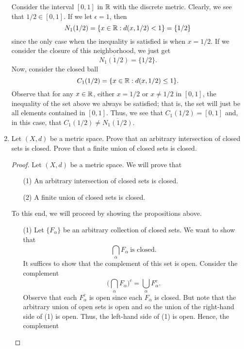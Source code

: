 \documentclass[a4paper]{article}
\begin{document}
\begin{enumerate}
        \begin{solution}
            Consider the interval \( [0,1] \) in \( \mathbb{R}  \) with the discrete metric. Clearly, we see that \( 1/2 \in [0,1] \). If we let \( \epsilon = 1   \), then 
            \[  {N}_{1}(1/2) = \{ x \in \mathbb{R} : d(x,1/2) < 1 \} = \{ 1/2 \}  \]
            since the only case when the inequality is satisfied is when \( x =  1/2  \). If we consider the closure of this neighborhood, we just get 
            \[  \overline{{N}_{1}(1/2)} = \{ 1/2 \}. \]
            Now, consider the closed ball 
            \[  {C}_{1}(1/2) = \{ x \in \mathbb{R} : d(x,1/2) \leq 1  \}. \]
            Observe that for any \( x \in \mathbb{R}  \), either \( x = 1/2 \) or \( x \neq 1/2 \) in \( [0,1] \), the inequality of the set above we always be satisfied; that is, the set will just be all elements contained in \( [0,1]  \). Thus, we see that \( {C}_{1}(1/2) = [0,1] \) and, in this case, that \( {C}_{1}(1/2) \neq \overline{{N}_{1}(1/2)} \).  
        \end{solution}
    \item Let \( (X,d) \) be a metric space. Prove that an arbitrary intersection of closed sets is closed. Prove that a finite union of closed sets is closed. 
        \begin{proof}
        Let \( (X,d) \) be a metric space. We will prove that
        \begin{enumerate}
            \item[(1)] An arbitrary intersection of closed sets is closed.
            \item[(2)] A finite union of closed sets is closed.
        \end{enumerate}
        To this end, we will proceed by showing the propositions above. 
        \begin{enumerate}
            \item[(1)] Let \( \{ {F}_{\alpha} \}  \) be an arbitrary collection of closed sets. We want to show that 
                \[  \bigcap_{ \alpha }^{  }  {F}_{\alpha} \ \text{is closed.} \]
               It suffices to show that the complement of this set is open. Consider the complement
               \[  \Big(  \bigcap_{ \alpha }^{  }  {F}_{\alpha} \Big)^{c} = \bigcup_{ \alpha }^{  } {F}_{\alpha}^{c}. \tag{1} \]
               Observe that each \( {F}_{\alpha}^{c} \) is open since each \( {F}_{\alpha} \) is closed. But note that the arbitrary union of open sets is open and so the union of the right-hand side of (1) is open. Thus, the left-hand side of (1) is open. Hence, the complement  

\end{enumerate}
\end{proof}
\end{enumerate}
\end{document}
